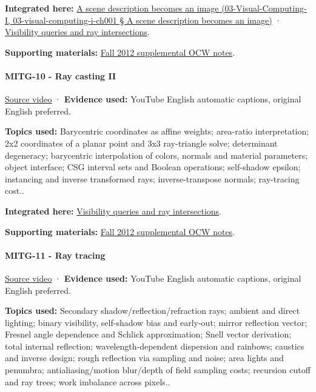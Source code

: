 \textbf{Integrated here:} \href{}{A scene description becomes an image (03-Visual-Computing-I, 03-visual-computing-i-ch001 § A scene description becomes an image)} · \hyperref[04-visual-computing-ii-ch028]{Visibility queries and ray intersections}.

\textbf{Supporting materials:} \href{https://ocw.mit.edu/courses/6-837-computer-graphics-fall-2012/pages/lecture-notes/}{Fall 2012 supplemental OCW notes}.

\paragraph{MITG-10 - Ray casting II}\label{mitg-10---ray-casting-ii}

\href{https://www.youtube.com/watch?v=gDayCevuE-U}{Source video} · \textbf{Evidence used:} YouTube English automatic captions, original English preferred.

\textbf{Topics used:} Barycentric coordinates as affine weights; area-ratio interpretation; 2x2 coordinates of a planar point and 3x3 ray-triangle solve; determinant degeneracy; barycentric interpolation of colors, normals and material parameters; object interface; CSG interval sets and Boolean operations; self-shadow epsilon; instancing and inverse transformed rays; inverse-transpose normals; ray-tracing cost..

\textbf{Integrated here:} \hyperref[04-visual-computing-ii-ch028]{Visibility queries and ray intersections}.

\textbf{Supporting materials:} \href{https://ocw.mit.edu/courses/6-837-computer-graphics-fall-2012/pages/lecture-notes/}{Fall 2012 supplemental OCW notes}.

\paragraph{MITG-11 - Ray tracing}\label{mitg-11---ray-tracing}

\href{https://www.youtube.com/watch?v=UL54Rf2O9RM}{Source video} · \textbf{Evidence used:} YouTube English automatic captions, original English preferred.

\textbf{Topics used:} Secondary shadow/reflection/refraction rays; ambient and direct lighting; binary visibility, self-shadow bias and early-out; mirror reflection vector; Fresnel angle dependence and Schlick approximation; Snell vector derivation; total internal reflection; wavelength-dependent dispersion and rainbows; caustics and inverse design; rough reflection via sampling and noise; area lights and penumbra; antialiasing/motion blur/depth of field sampling costs; recursion cutoff and ray trees; work imbalance across pixels..


